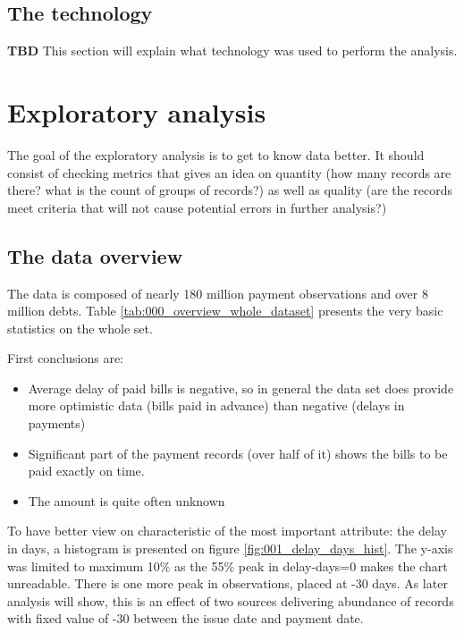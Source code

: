 \documentclass{article}
\begin{document}
\pagebreak

\subsection{The technology}

\textbf{TBD} This section will explain what technology was used to perform the analysis.

\section{Exploratory analysis}

The goal of the exploratory analysis is to get to know data better.
It should consist of checking metrics that gives an idea on quantity (how many records are there? what is the count of groups of records?)
as well as quality (are the records meet criteria that will not cause potential errors in further analysis?)

\subsection{The data overview}

The data is composed of nearly 180 million payment observations and over 8 million debts.
Table \ref{tab:000_overview_whole_dataset} presents the very basic statistics on the whole set. \par

First conclusions are:
\begin{itemize}
    \item Average delay of paid bills is negative, so in general the data set does provide more optimistic data (bills paid in advance) than negative (delays in payments)
    \item Significant part of the payment records (over half of it) shows the bills to be paid exactly on time.
    \item The amount is quite often unknown
\end{itemize}

To have better view on characteristic of the most important attribute: the delay in days, a histogram is presented on figure \ref{fig:001_delay_days_hist}.
The y-axis was limited to maximum 10\% as the 55\% peak in delay-days=0 makes the chart unreadable.
There is one more peak in observations, placed at -30 days.
As later analysis will show, this is an effect of two sources delivering abundance of records with fixed value of -30 between the issue date and payment date.\par
\end{document}
